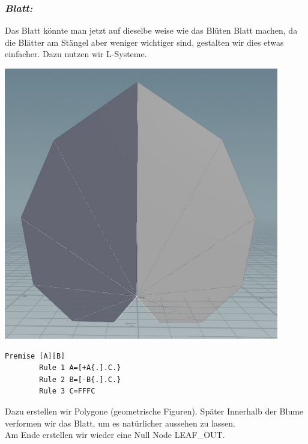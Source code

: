 \documentclass[paper=a4,fontsize=12pt,ngerman]{scrartcl}
\begin{document}
	\subsubsection*{\textit{Blatt:}}
	Das Blatt könnte man jetzt auf dieselbe weise wie das Blüten Blatt machen, da die Blätter am Stängel aber weniger wichtiger sind, gestalten wir dies etwas einfacher. Dazu nutzen wir L-Systeme.\\
	\begin{minipage}{0.3\textwidth}
		\includegraphics[width=0.9\textwidth]{graphics/leaf1.JPG}
	\end{minipage}
	\begin{minipage}{0.7\textwidth}
		\begin{lstlisting}[basicstyle=\scriptsize]
		Premise [A][B]
		Rule 1 A=[+A{.].C.}
		Rule 2 B=[-B{.].C.}
		Rule 3 C=FFFC
	\end{lstlisting} 
	Dazu erstellen wir Polygone (geometrische Figuren). Später Innerhalb der Blume verformen wir das Blatt, um es natürlicher aussehen zu lassen.\\
	Am Ende erstellen wir wieder eine Null Node LEAF\_OUT.
	\end{minipage}
	
\end{document}
